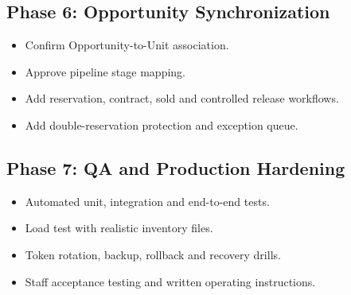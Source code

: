 \documentclass[10pt]{article}
\begin{document}
\subsection{Phase 6: Opportunity Synchronization}
\begin{itemize}
\item Confirm Opportunity-to-Unit association.
\item Approve pipeline stage mapping.
\item Add reservation, contract, sold and controlled release workflows.
\item Add double-reservation protection and exception queue.
\end{itemize}

\subsection{Phase 7: QA and Production Hardening}
\begin{itemize}
\item Automated unit, integration and end-to-end tests.
\item Load test with realistic inventory files.
\item Token rotation, backup, rollback and recovery drills.
\item Staff acceptance testing and written operating instructions.
\end{itemize}
\end{document}
